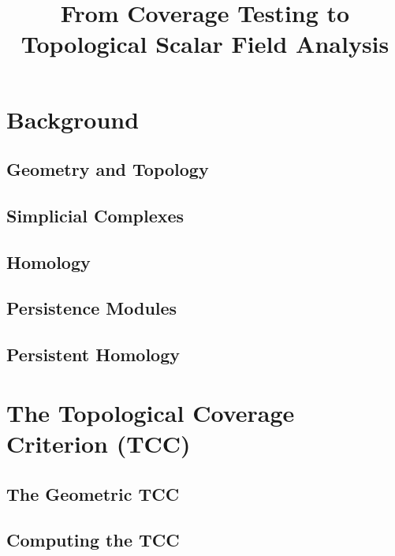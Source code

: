 \documentclass[12pt]{article}
\begin{document}
\title{From Coverage Testing to Topological Scalar Field Analysis}




\section{Background}

\subsection{Geometry and Topology}
  

\subsection{Simplicial Complexes}\label{sec:complexes}
  


\subsection{Homology}\label{sec:homology}
%   

\subsection{Persistence Modules}
  

\subsection{Persistent Homology}
%   


\clearpage
\section{The Topological Coverage Criterion (TCC)}



\subsection{The Geometric TCC}


\subsection{Computing the TCC}
  
\end{document}
